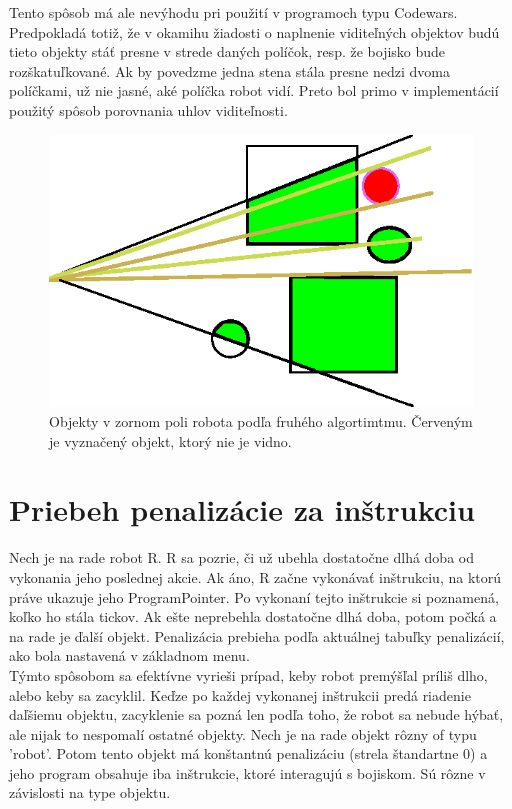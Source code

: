 \indent
\newline
\indent Tento spôsob má ale nevýhodu pri použití v programoch typu Codewars. Predpokladá totiž, že v okamihu žiadosti o naplnenie viditeľných objektov budú tieto objekty stáť presne v strede daných políčok, resp. že bojisko bude rozškatuľkované. Ak by povedzme jedna stena stála presne nedzi dvoma políčkami, už nie jasné, aké políčka robot vidí. Preto bol primo v implementácií použitý spôsob porovnania uhlov viditeľnosti.
\\
\begin{figure}
\centering
\includegraphics{visibility2}
\caption { Objekty v zornom poli robota podľa fruhého algortimtmu. Červeným je vyznačený objekt, ktorý nie je vidno.}
\label{fig:visibleo}
\end{figure}
\indent
\section{Priebeh penalizácie za inštrukciu}
Nech je na rade robot R. R sa pozrie, či už ubehla dostatočne dlhá doba od vykonania jeho poslednej akcie. Ak áno, R začne vykonávať inštrukciu, na ktorú práve ukazuje jeho ProgramPointer. Po vykonaní tejto inštrukcie si poznamená, koľko ho stála tickov. Ak ešte neprebehla dostatočne dlhá doba, potom počká a na rade je ďalší objekt. Penalizácia prebieha podľa aktuálnej tabuľky penalizácií, ako bola nastavená v základnom menu. \\

Týmto spôsobom sa efektívne vyrieši prípad, keby robot premýšľal príliš dlho, alebo keby sa zacyklil. Keďze po každej vykonanej inštrukcii predá riadenie daľšiemu objektu, zacyklenie sa pozná len podľa toho, že robot sa nebude hýbať, ale nijak to nespomalí ostatné objekty.%
\newline
Nech je na rade objekt rôzny of typu 'robot'. Potom tento objekt má konštantnú penalizáciu (strela štandartne 0) a jeho program obsahuje iba inštrukcie, ktoré interagujú s bojiskom. Sú rôzne v závislosti na type objektu.

